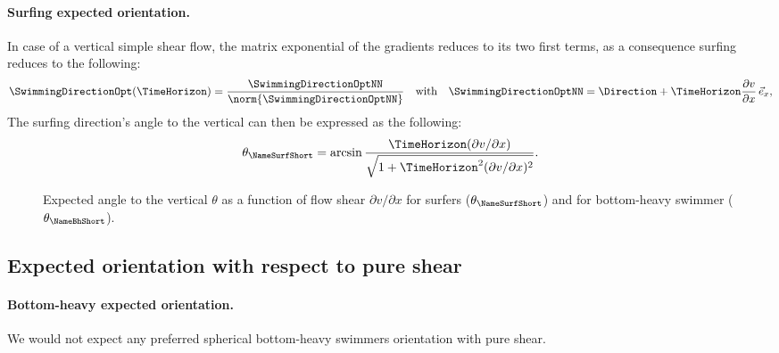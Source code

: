 \paragraph{Surfing expected orientation.}
In case of a vertical simple shear flow, the matrix exponential of the gradients reduces to its two first terms, as a consequence surfing reduces to the following:
\begin{equation}
	\label{eq:optimal_swimming_direction_partial_asym}
	\SwimmingDirectionOpt(\TimeHorizon) = \frac{\SwimmingDirectionOptNN}{\norm{\SwimmingDirectionOptNN}} \quad \text{with} \quad \SwimmingDirectionOptNN = \Direction + \TimeHorizon \frac{\partial v}{\partial x} \, \vec{e}_x,
\end{equation}
The surfing direction's angle to the vertical can then be expressed as the following:
\begin{equation}\label{eq:surfing_orientation}
	\theta_{\mathrm{\NameSurfShort}} = \mathrm{arcsin} \, \frac{\TimeHorizon (\partial v / \partial x)}{\sqrt{1 + \TimeHorizon^2 (\partial v / \partial x)^2}}.
\end{equation}

\begin{figure}%
	\centering
	
	\caption{
		Expected angle to the vertical $\theta$ as a function of flow shear $\partial v/\partial x$ for surfers ($\theta_{\mathrm{\NameSurfShort}}$) and for bottom-heavy swimmer ($\theta_{\mathrm{\NameBhShort}}$).
	}
	\label{fig:shear_angle_to_the_vertical}
\end{figure}

\subsection{Expected orientation with respect to pure shear}

\paragraph{Bottom-heavy expected orientation.}
We would not expect any preferred spherical bottom-heavy swimmers orientation with pure shear.

